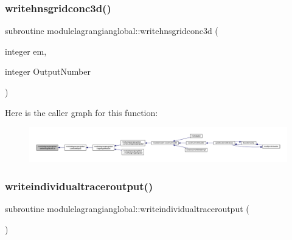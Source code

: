 \subsubsection{\texorpdfstring{writehnsgridconc3d()}{writehnsgridconc3d()}}
{\footnotesize\ttfamily subroutine modulelagrangianglobal\+::writehnsgridconc3d (\begin{DoxyParamCaption}\item[{integer}]{em,  }\item[{integer}]{Output\+Number }\end{DoxyParamCaption})\hspace{0.3cm}{\ttfamily [private]}}

Here is the caller graph for this function\+:\nopagebreak
\begin{figure}[H]
\begin{center}
\leavevmode
\includegraphics[width=350pt]{namespacemodulelagrangianglobal_a94325a61c883247ceef185733a82f5d2_icgraph}
\end{center}
\end{figure}
\mbox{\label{namespacemodulelagrangianglobal_adbd561b298718cf3849462a24cca974e}} 
\subsubsection{\texorpdfstring{writeindividualtraceroutput()}{writeindividualtraceroutput()}}
{\footnotesize\ttfamily subroutine modulelagrangianglobal\+::writeindividualtraceroutput (\begin{DoxyParamCaption}{ }\end{DoxyParamCaption})\hspace{0.3cm}{\ttfamily [private]}}

